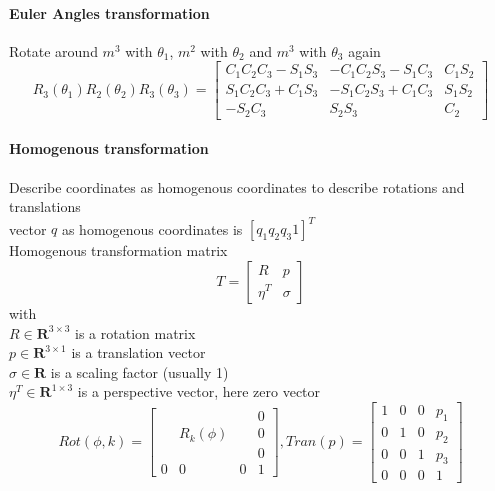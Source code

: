 \documentclass{article}
\begin{document}
	\paragraph{Euler Angles transformation} Rotate around $m^3$ with $\theta_{1}$, $m^2$ with $\theta_{2}$ and $m^3$ with $\theta_{3}$ again
	\begin{equation}
	R_{3}(\theta_{1}) R_{2}(\theta_{2}) R_{3}(\theta_{3}) = 
	\begin{bmatrix}
	C_{1} C_{2} C_{3} - S_{1} S_{3} & -C_{1} C_{2} S_{3} - S_{1} C_{3} & C_{1} S_{2}\\
	S_{1} C_{2} C_{3} + C_{1} S_{3}  & -S_{1} C_{2} S_{3} + C_{1} C_{3} & S_{1} S_{2}\\
	-S_{2} C_{3} & S_{2} S_{3} & C_{2}
	\end{bmatrix}
	\end{equation}
	
	\paragraph{Homogenous transformation} Describe coordinates as homogenous coordinates to describe rotations and translations\\
	vector $q$ as homogenous coordinates is $[q_{1} q_{2} q_{3} 1]^T$\\
	Homogenous transformation matrix
	\begin{equation}
	T = 
	\begin{bmatrix}
	R & p\\
	\eta^T & \sigma
	\end{bmatrix}
	\end{equation}
	with\\
	$R \in \mathbf{R}^{3 \times 3}$ is a rotation matrix\\
	$p \in \mathbf{R}^{3 \times 1}$ is a translation vector\\
	$\sigma \in \mathbf{R}$ is a scaling factor (usually 1)\\
	$\eta^T \in \mathbf{R}^{1 \times 3}$ is a perspective vector, here zero vector	\begin{equation}
	Rot(\phi, k) = 
	\begin{bmatrix}
	& & & 0\\
	& R_{k}(\phi) & & 0\\
	& & & 0\\
	0 & 0 & 0 & 1
	\end{bmatrix}, 
	Tran(p) = 
	\begin{bmatrix}
	1 & 0 & 0 & p_{1}\\
	0 & 1 & 0 & p_{2}\\
	0 & 0 & 1 & p_{3}\\
	0 & 0 & 0 & 1
	\end{bmatrix}
	\end{equation}
	
\end{document}
